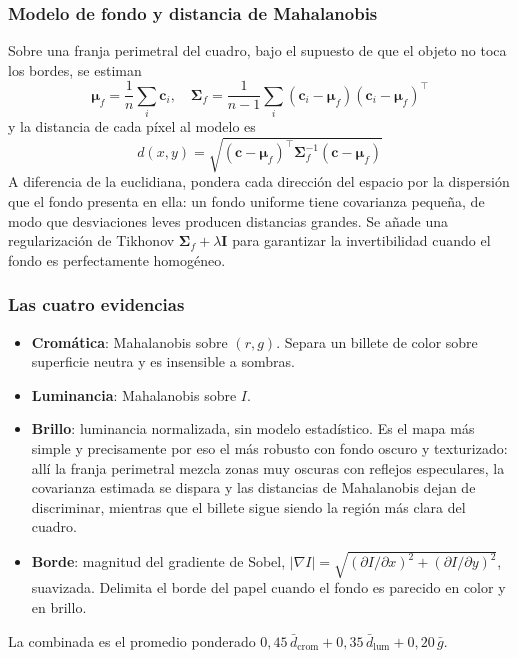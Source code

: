 \documentclass[conference]{IEEEtran}
\begin{document}
\subsubsection{Modelo de fondo y distancia de Mahalanobis}
Sobre una franja perimetral del cuadro, bajo el supuesto de que el
objeto no toca los bordes, se estiman
\begin{equation}
\boldsymbol{\mu}_f = \frac{1}{n}\sum_i \mathbf{c}_i, \quad
\boldsymbol{\Sigma}_f = \frac{1}{n-1}\sum_i
(\mathbf{c}_i-\boldsymbol{\mu}_f)(\mathbf{c}_i-\boldsymbol{\mu}_f)^{\!\top}
\end{equation}
y la distancia de cada píxel al modelo es
\begin{equation}
d(x,y) = \sqrt{(\mathbf{c}-\boldsymbol{\mu}_f)^{\!\top}
\boldsymbol{\Sigma}_f^{-1}(\mathbf{c}-\boldsymbol{\mu}_f)}
\end{equation}
A diferencia de la euclidiana, pondera cada dirección del espacio por
la dispersión que el fondo presenta en ella: un fondo uniforme tiene
covarianza pequeña, de modo que desviaciones leves producen distancias
grandes. Se añade una regularización de Tikhonov
$\boldsymbol{\Sigma}_f + \lambda\mathbf{I}$ para garantizar la
invertibilidad cuando el fondo es perfectamente homogéneo.

\subsubsection{Las cuatro evidencias}
\begin{itemize}
\item \textbf{Cromática}: Mahalanobis sobre $(r,g)$. Separa un billete
      de color sobre superficie neutra y es insensible a sombras.
\item \textbf{Luminancia}: Mahalanobis sobre $I$.
\item \textbf{Brillo}: luminancia normalizada, sin modelo estadístico.
      Es el mapa más simple y precisamente por eso el más robusto con
      fondo oscuro y texturizado: allí la franja perimetral mezcla
      zonas muy oscuras con reflejos especulares, la covarianza
      estimada se dispara y las distancias de Mahalanobis dejan de
      discriminar, mientras que el billete sigue siendo la región más
      clara del cuadro.
\item \textbf{Borde}: magnitud del gradiente de Sobel,
      $|\nabla I| = \sqrt{(\partial I/\partial x)^2 + (\partial I/\partial y)^2}$,
      suavizada. Delimita el borde del papel cuando el fondo es
      parecido en color y en brillo.
\end{itemize}
La combinada es el promedio ponderado
$0{,}45\,\bar{d}_{\text{crom}} + 0{,}35\,\bar{d}_{\text{lum}}
+ 0{,}20\,\bar{g}$.
\end{document}
